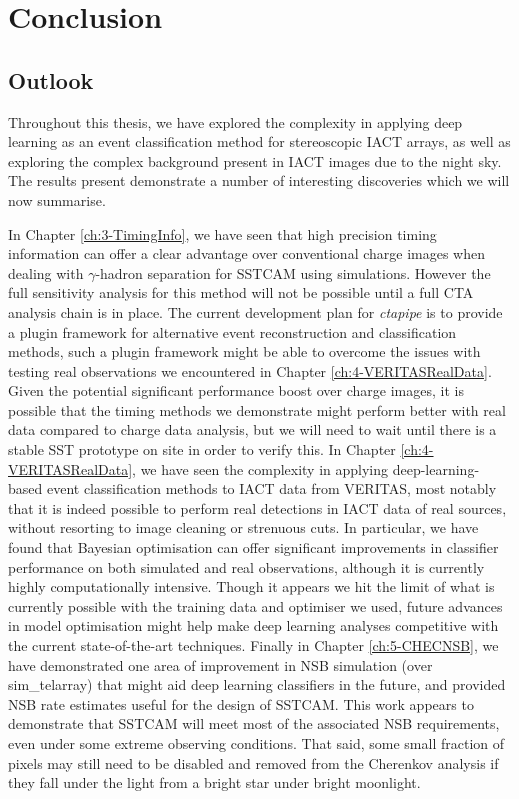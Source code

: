 \chapter{\label{ch6-Conclusions} Conclusion}
\minitoc
\section{Outlook}
Throughout this thesis, we have explored the complexity in applying deep learning as an event classification method for stereoscopic IACT arrays, as well as exploring the complex background present in IACT images due to the night sky. The results present demonstrate a number of interesting discoveries which we will now summarise.

In Chapter \ref{ch:3-TimingInfo}, we have seen that high precision timing information can offer a clear advantage over conventional charge images when dealing with $\gamma$-hadron separation for SSTCAM using simulations. However the full sensitivity analysis for this method will not be possible until a full CTA analysis chain is in place. The current development plan for \textit{ctapipe} is to provide a plugin framework for alternative event reconstruction and classification methods, such a plugin framework might be able to overcome the issues with testing real observations we encountered in Chapter \ref{ch:4-VERITASRealData}. Given the potential significant performance boost over charge images, it is possible that the timing methods we demonstrate might perform better with real data compared to charge data analysis, but we will need to wait until there is a stable SST prototype on site in order to verify this. In Chapter \ref{ch:4-VERITASRealData}, we have seen the complexity in applying deep-learning-based event classification methods to IACT data from VERITAS, most notably that it is indeed possible to perform real detections in IACT data of real sources, without resorting to image cleaning or strenuous cuts. In particular, we have found that Bayesian optimisation can offer significant improvements in classifier performance on both simulated and real observations, although it is currently highly computationally intensive. Though it appears we hit the limit of what is currently possible with the training data and optimiser we used, future advances in model optimisation might help make deep learning analyses competitive with the current state-of-the-art techniques. Finally in Chapter \ref{ch:5-CHECNSB}, we have demonstrated one area of improvement in NSB simulation (over sim\_telarray) that might aid deep learning classifiers in the future, and provided NSB rate estimates useful for the design of SSTCAM. This work appears to demonstrate that SSTCAM will meet most of the associated NSB requirements, even under some extreme observing conditions. That said, some small fraction of pixels may still need to be disabled and removed from the Cherenkov analysis if they fall under the light from a bright star under bright moonlight.

